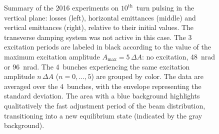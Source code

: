 \documentclass[%
 reprint,
 amsmath,amssymb,
 aps,
prstab,
longbibliography
]{revtex4-1}
\begin{document}
\begin{figure}
\begin{tabular}{ccc}
  \end{tabular}
  \caption{Summary of the 2016 experiments on $10^{\mathrm{th}}$~turn
    pulsing in the vertical plane: losses (left), horizontal
    emittances (middle) and vertical emittances (right), relative to
    their initial values. The transverse damping system was not active
    in this case. The 3 excitation periods are labeled in black
    according to the value of the maximum excitation amplitude
    $A_{\mathrm{max}} = 5 \, \Delta A$: no excitation, 48~nrad or
    96~nrad. The 4~bunches experiencing the same excitation amplitude
    $n \, \Delta A$ ($n = 0, \ldots, 5$) are grouped by color. The
    data are averaged over the 4~bunches, with the envelope
    representing the standard deviation. The area with a blue
    background highlights qualitatively the fast adjustment period of
    the beam distribution, transitioning into a new equilibrium state
    (indicated by the gray background).}
  \label{fig:10thexp}
\end{figure}
\end{document}
